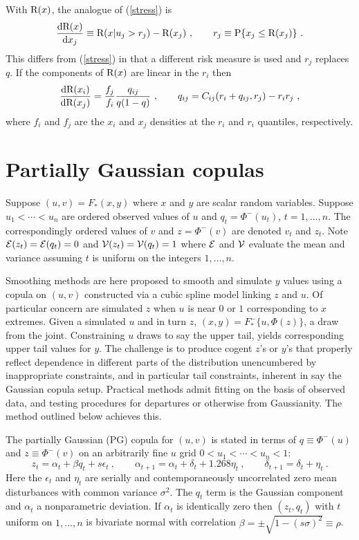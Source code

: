 \documentclass[authoryear]{elsarticle}
\newcommand{\p}{\mathrm{P}}
\newcommand{\eps}{\epsilon}
\newcommand{\Ex}{{\cal E}}
\newcommand{\de}{\mathrm{d}}
\newcommand{\eref}[1]{(\ref{#1})}
\newcommand{\cq}{\ , \qquad}
\newcommand{\Vx}{{\cal V}}
\newcommand{\be}[1]{\begin{equation}\label{#1}}
\newcommand{\ee}{\end{equation}}
\begin{document}
With $\mathrm{R}(x)$, the analogue of \eref{stress} is 
\be{stress2}
\frac{\de\r(x)}{\de x_j} \equiv \r(x|u_j>r_j) - \r(x_j)\cq r_j\equiv\p\{x_j\le\r(x_j)\} \ .
\ee
This differs from \eref{stress}  in that a different risk measure is used and  $r_j$ replaces $q$.   If  the components of $\mathrm{R}(x)$ are linear in the $r_i$ then
\be{implicit2}
\frac{\de\r(x_i)}{\de\r(x_j)} =  
\frac{f_j}{f_i} 
 \frac{q_{ij}}{q(1-q)}\cq q_{ij}=C_{ij}(r_i+q_{ij},r_j) - r_ir_j\ ,
\ee
where $f_i$ and $f_j$ are the $x_i$ and $x_j$ densities at the $r_i$ and $r_i$ quantiles, respectively. 

\section{Partially Gaussian copulas}

Suppose $(u,v)=F_*(x,y)$  where $x$ and $y$ are scalar random variables.    Suppose $u_1<\cdots<u_n$  are   ordered observed values of $u$ and $q_t=\Phi^-(u_t)$, $t=1,\ldots,n$.  The correspondingly ordered values of $v$ and $z=\Phi^-(v)$ are denoted $v_t$ and $z_t$.  Note $\Ex(z_t)=\Ex(q_t)=0$ and $\Vx(z_t)=\Vx(q_t)=1$ where $\Ex$ and $\Vx$ evaluate the mean and variance assuming $t$ is uniform on the integers $1,\ldots,n$. 

Smoothing methods are here proposed to smooth and simulate $y$ values  using a copula on $(u,v)$ constructed via    a cubic spline model linking $z$ and $u$.   Of particular concern are simulated $z$ when $u$ is  near $0$ or $1$ corresponding to  $x$ extremes.    Given a simulated $u$ and in turn $z$, $(x,y)=F^-_*\{u,\Phi(z)\}$, a draw from the joint.  Constraining $u$ draws to say the upper tail, yields corresponding upper tail values for $y$.   The challenge is to produce cogent $z$'s or $y$'s that properly reflect dependence in different parts of the distribution unencumbered by inappropriate constraints, and in particular tail constraints, inherent in say the Gaussian copula setup.    Practical methods admit fitting on the basis of observed data, and testing procedures for  departures or otherwise from Gaussianity.   The method outlined below achieves this.

The partially Gaussian  (PG) copula for $(u,v)$ is stated in terms of  $q\equiv\Phi^-(u)$ and $z\equiv\Phi^-(v)$ on an arbitrarily fine $u$ grid $0<u_1<\cdots<u_n<1$:  
\be{cusp}
z_t = \alpha_t+\beta q_t+ s\eps_t\cq \alpha_{t+1}=\alpha_t +\delta_t+1.268\eta_t\cq \delta_{t+1}=\delta_t+\eta_t\ .
\ee
Here the $\eps_t$ and $\eta_t$ are serially and contemporaneously uncorrelated zero mean disturbances with common variance $\sigma^2$.  The  $q_t$ term is the   Gaussian component and  $\alpha_t$ a nonparametric deviation.  If $\alpha_t$ is identically zero then  $(z_t,q_t)$ with $t$ uniform on $1,\ldots,n$  is bivariate normal  with correlation $\beta=\pm\sqrt{1-(s\sigma)^2}\equiv\rho$.  
\end{document}
